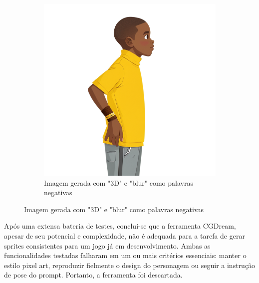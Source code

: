 \begin{figure}[htbp]
\begin{subfigure}{0.45\linewidth}
        \includegraphics[width=1\linewidth]{figs/cgDream/res_char_jug_estilo1c.png}
        \caption{\small Imagem gerada com "3D" e "blur" como palavras negativas}
        \label{fig:cgDreamJugComNegativo}
    \end{subfigure}
\end{figure}

Após uma extensa bateria de testes, conclui-se que a ferramenta CGDream, apesar de seu potencial e complexidade, não é adequada para a tarefa de gerar sprites consistentes para um jogo já em desenvolvimento. Ambas as funcionalidades testadas falharam em um ou mais critérios essenciais: manter o estilo pixel art, reproduzir fielmente o design do personagem ou seguir a instrução de pose do prompt. Portanto, a ferramenta foi descartada.